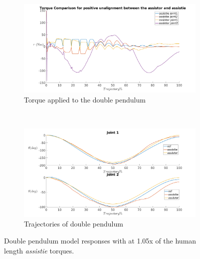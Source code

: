 \begin{figure}[h]
    \centering
    \begin{subfigure}{0.5\textwidth}
        \centering
        \includegraphics[width=\linewidth]{images/controllers/larger_length_torque.png}
        \caption[Double Pendulum: Positive Alignment-Effort]{Torque applied to the double pendulum}
        \label{fig:small_length_torque}
    \end{subfigure}%
    ~
    \begin{subfigure}{0.5\textwidth}
        \centering
        \includegraphics[width=\linewidth]{images/controllers/larger_length_traj.png}
        \caption[Double Pendulum: Positive Alignment-Trajectory]{Trajectories of double pendulum}
        \label{fig:small_length_traj}
    \end{subfigure}
    \caption[Double Pendulum: Positive Alignment]{Double pendulum model responses with at 1.05x of the human length \textit{assistie} torques.}
    \label{fig:larger_length}
\end{figure}


